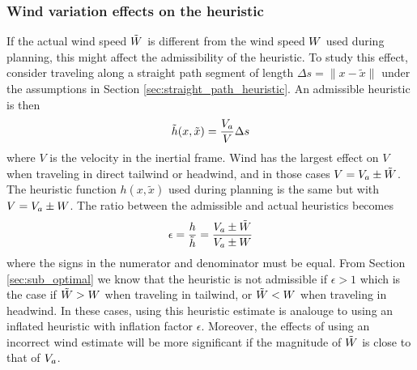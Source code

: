 \subsubsection{Wind variation effects on the heuristic}
If the actual wind speed $\tilde{W}$ is different from the wind speed $W$ used during planning, this 
might affect the admissibility of the heuristic. 
To study this effect, consider traveling along a straight path segment of length $\Delta s=\|x-\tilde{x}\|$ under the assumptions in Section \ref{sec:straight_path_heuristic}. 
An admissible heuristic is then 
\begin{equation}
    \tilde{h}(x, \tilde{x})=\frac{V_a}{V}\Delta s
\end{equation}
where $V$ is the velocity in the inertial frame. Wind has the largest effect on $V$ when traveling in direct tailwind or headwind, and in those cases $V=V_a\pm \tilde{W}$. The 
heuristic function $h(x, \tilde{x})$ used during planning is the same but with $V=V_a\pm W$. The ratio between the admissible and actual heuristics becomes
\begin{equation}\label{eq:wind_heuristic_eps}
    \epsilon = \frac{h}{\tilde{h}} = \frac{V_a \pm \tilde{W}}{V_a \pm W}
\end{equation}
where the signs in the numerator and denominator must be equal. From Section \ref{sec:sub_optimal} we know that the heuristic is not admissible if 
$\epsilon>1$ which is the case if $\tilde{W}>W$ when traveling in tailwind, or $\tilde{W}<W$ when traveling in headwind.
In these cases, using this heuristic estimate is analouge to using an inflated heuristic with inflation factor $\epsilon$. Moreover, the effects of using an incorrect wind estimate will be more significant if the 
magnitude of $\tilde{W}$ is close to that of $V_a$.